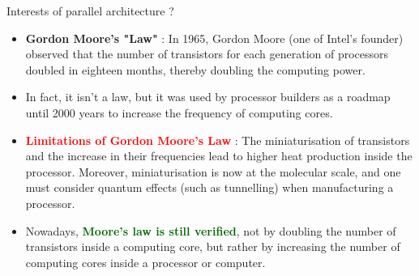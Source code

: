 \documentclass[compress,10pt,aspectratio=169]{beamer}
\begin{document}
\begin{frame}[fragile]{Interests of parallel architecture ?}
    \small
    \begin{itemize}
        \item \textbf{\textcolor{NavyBlue}{Gordon Moore's "Law"}} : In 1965, Gordon Moore (one of Intel's founder) observed that the 
              number of transistors for each generation of processors doubled in eighteen months, thereby doubling the computing power.
        \item In fact, \alert{it isn't a law}, but it was used by processor builders as a roadmap until 2000 years to increase the frequency
              of computing cores.
        \item \textbf{\textcolor{red}{Limitations of Gordon Moore's Law}} : The miniaturisation of transistors and the increase in their
              frequencies lead to higher heat production inside the processor. Moreover, miniaturisation is now at the molecular scale, and one must
              consider quantum effects (such as tunnelling) when manufacturing a processor.
        \item Nowadays, \textbf{\textcolor{DarkGreen}{Moore's law is still verified}}, not by doubling the number of transistors 
              inside a computing core, but rather by increasing the number of computing cores inside a processor or computer.
    \end{itemize}
\end{frame}
\end{document}
